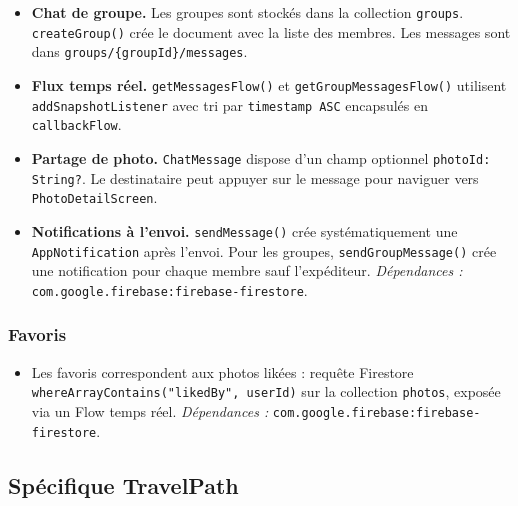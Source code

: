 \documentclass[a4paper, 12pt]{article}
\begin{document}
\begin{justify}
\begin{itemize}
    \item \textbf{Chat de groupe.}
    Les groupes sont stockés dans la collection \texttt{groups}. \texttt{createGroup()} crée le document avec la liste des membres. Les messages sont dans \texttt{groups/\allowbreak{}\{groupId\}/\allowbreak{}messages}.

    \item \textbf{Flux temps réel.}
    \texttt{getMessagesFlow()} et \texttt{getGroupMessagesFlow()} utilisent \texttt{addSnapshotListener} avec tri par \texttt{timestamp ASC} encapsulés en \texttt{callbackFlow}.

    \item \textbf{Partage de photo.}
    \texttt{ChatMessage} dispose d'un champ optionnel \texttt{photoId:\allowbreak{} String?}. Le destinataire peut appuyer sur le message pour naviguer vers \texttt{PhotoDetailScreen}.

    \item \textbf{Notifications à l'envoi.}
    \texttt{sendMessage()} crée systématiquement une \texttt{AppNotification} après l'envoi. Pour les groupes, \texttt{sendGroupMessage()} crée une notification pour chaque membre sauf l'expéditeur.
    \newline\textit{Dépendances :} \texttt{com.\allowbreak{}google.\allowbreak{}firebase:\allowbreak{}firebase-firestore}.

\end{itemize}

\subsubsection*{Favoris}

\begin{itemize}

    \item Les favoris correspondent aux photos likées : requête Firestore \texttt{whereArrayContains("likedBy", userId)} sur la collection \texttt{photos}, exposée via un Flow temps réel.
    \newline\textit{Dépendances :} \texttt{com.\allowbreak{}google.\allowbreak{}firebase:\allowbreak{}firebase-firestore}.

\end{itemize}


\subsection*{Spécifique TravelPath}


\end{justify}
\end{document}
